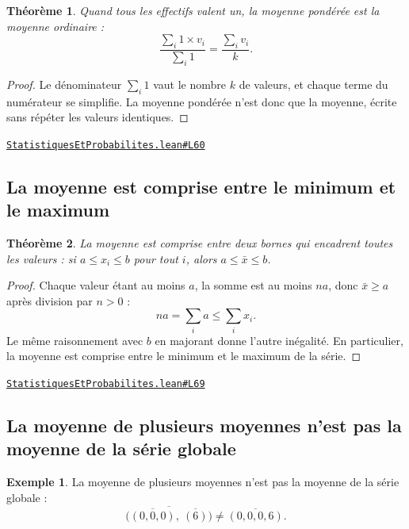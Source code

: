 \documentclass[11pt,a4paper]{article}
\theoremstyle{definition}
\newtheorem{exemple}{Exemple}
\theoremstyle{plain}
\newtheorem{theoreme}{Théorème}
\newcommand{\source}[2]{\par\smallskip\noindent\hfill{\footnotesize\href{#1}{\texttt{#2}}}\par\smallskip}
\begin{document}
\begin{theoreme}
Quand tous les effectifs valent un, la moyenne pondérée est la moyenne ordinaire :
\[ \frac{\sum_i 1 \times v_i}{\sum_i 1} = \frac{\sum_i v_i}{k} . \]
\end{theoreme}

\begin{proof}
Le dénominateur $\sum_i 1$ vaut le nombre $k$ de valeurs, et chaque terme du numérateur
se simplifie. La moyenne pondérée n'est donc que la moyenne, écrite sans répéter les
valeurs identiques.
\end{proof}
\source{https://github.com/Commutator-IO/learn-lean/blob/main/courses/01-college/06-statistiques-et-probabilites/StatistiquesEtProbabilites.lean\#L60}{StatistiquesEtProbabilites.lean\#L60}

\subsection{La moyenne est comprise entre le minimum et le maximum}

\begin{theoreme}
La moyenne est comprise entre deux bornes qui encadrent toutes les valeurs : si
$a \le x_i \le b$ pour tout $i$, alors $a \le \bar{x} \le b$.
\end{theoreme}

\begin{proof}
Chaque valeur étant au moins $a$, la somme est au moins $na$, donc $\bar{x} \ge a$
après division par $n > 0$ :
\[ na = \sum_i a \le \sum_i x_i . \]
Le même raisonnement avec $b$ en majorant donne l'autre inégalité. En particulier, la
moyenne est comprise entre le minimum et le maximum de la série.
\end{proof}
\source{https://github.com/Commutator-IO/learn-lean/blob/main/courses/01-college/06-statistiques-et-probabilites/StatistiquesEtProbabilites.lean\#L69}{StatistiquesEtProbabilites.lean\#L69}

\subsection{La moyenne de plusieurs moyennes n'est pas la moyenne de la série globale}

\begin{exemple}
La moyenne de plusieurs moyennes n'est pas la moyenne de la série globale :
\[ \overline{\bigl(\overline{(0,0,0)},\ \overline{(6)}\bigr)} \ne \overline{(0,0,0,6)} . \]
\end{exemple}
\end{document}
